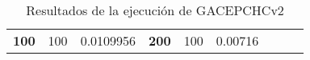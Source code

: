 \begin{table}[H]
\begin{tabular}{|cclcclccc}
\multicolumn{1}{|c|}{\multirow{-39}{*}{\cellcolor[HTML]{FFFFC7}\textbf{100}}} & \multicolumn{1}{c|}{\multirow{-9}{*}{\cellcolor[HTML]{DDFDFF}100}} & \multicolumn{1}{l|}{\cellcolor[HTML]{DAE8FC}0.0109956}   & \multicolumn{1}{c|}{\multirow{-39}{*}{\cellcolor[HTML]{FFFFC7}\textbf{200}}} & \multicolumn{1}{c|}{\multirow{-10}{*}{\cellcolor[HTML]{DDFDFF}100}} & \multicolumn{1}{l|}{\cellcolor[HTML]{DDFDFF}0.00716}     &                                                                              &                                                                    &                                                          \\ \cline{1-6}
\end{tabular}
\caption{\label{t:GACEPCHCv2}Resultados de la ejecución de GACEPCHCv2}
\end{table}

